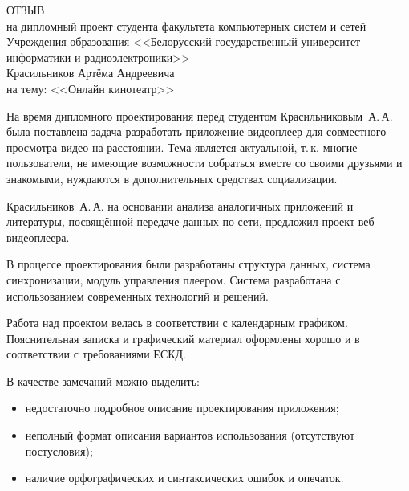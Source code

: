  
\thispagestyle{empty}
 
\begin{singlespace}
 
{\small
 \begin{center}
   \begin{minipage}{0.8\textwidth}
     \begin{center}
       {\normalsize ОТЗЫВ}\\[1em]
       на дипломный проект студента факультета компьютерных систем и сетей Учреждения образования <<Белорусский государственный университет информатики и радиоэлектроники>>\\
       Красильников Артёма Андреевича \\
       на тему: <<Онлайн кинотеатр>>
     \end{center}
   \end{minipage}
 \end{center}
 
На время дипломного проектирования перед студентом Красильниковым~А.\,А. была поставлена задача разработать приложение видеоплеер для совместного просмотра видео на расстоянии.
Тема является актуальной, т.\,к. многие пользователи, не имеющие возможности собраться вместе со своими друзьями и знакомыми, нуждаются в дополнительных средствах социализации.
 
Красильников~А.\,А. на основании анализа аналогичных приложений и литературы, посвящённой передаче данных по сети, предложил проект веб-видеоплеера.
 
В процессе проектирования были разработаны структура данных, система синхронизации, модуль управления плеером.
Система разработана с использованием современных технологий и решений.
 
Работа над проектом велась в соответствии с календарным графиком.
Пояснительная записка и графический материал оформлены хорошо и в соответствии с требованиями ЕСКД.

В качестве замечаний можно выделить:
\begin{itemize}
  \item недостаточно подробное описание проектирования приложения;
  \item неполный формат описания вариантов использования (отсутствуют постусловия);
  \item наличие орфографических и синтаксических ошибок и опечаток.
\end{itemize}
 
}
\end{singlespace}
